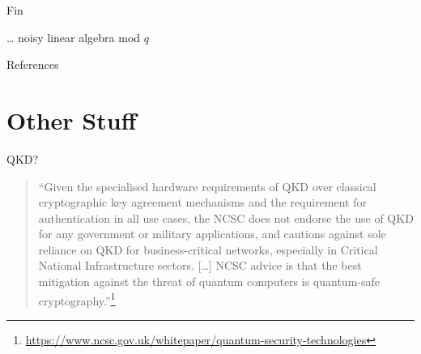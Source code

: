 \documentclass[xcolor=table,10pt,aspectratio=169]{beamer}
\begin{document}
\begin{frame}[label={sec:org96b692e},standout]{Fin}
\begin{center}
\Large \alert{… noisy linear algebra mod \(q\)}
\end{center}

\end{frame}
\begin{frame}[allowframebreaks]{References}
\renewcommand*{\bibfont}{\scriptsize}
\printbibliography[heading=none]
\end{frame}
\section{Other Stuff}
\label{sec:orgf2bf552}
\begin{frame}[label={sec:org2fb09c9}]{QKD?}
\begin{quote}
``Given the specialised hardware requirements of QKD over classical cryptographic key agreement mechanisms and the requirement for authentication in all use cases, the NCSC does not endorse the use of QKD for any government or military applications, and cautions against sole reliance on QKD for business-critical networks, especially in Critical National Infrastructure sectors. […] NCSC advice is that the best mitigation against the threat of quantum computers is quantum-safe cryptography.''\footnote{\url{https://www.ncsc.gov.uk/whitepaper/quantum-security-technologies}}
\end{quote}
\end{frame}
\end{document}
